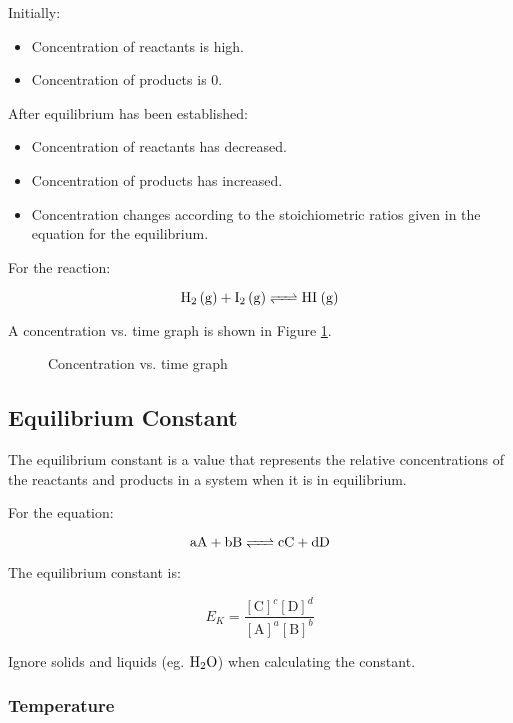 \documentclass[a4paper,11pt]{article}
\begin{document}
Initially:

\begin{itemize}
\item Concentration of reactants is high.
\item Concentration of products is 0.
\end{itemize}

After equilibrium has been established:

\begin{itemize}
\item Concentration of reactants has decreased.
\item Concentration of products has increased.
\item Concentration changes according to the stoichiometric ratios given in the
	equation for the equilibrium.
\end{itemize}

For the reaction:

$$
\ce{H2 (g) + I2 (g) <=> HI (g)}
$$

A concentration vs. time graph is shown in Figure
\ref{fig:equilibrium-concentration}.

\begin{figure}
\begin{center}
\caption{Concentration vs. time graph}
\label{fig:equilibrium-concentration}
\end{center}
\end{figure}


\subsection{Equilibrium Constant}

The equilibrium constant is a value that represents the relative concentrations
of the reactants and products in a system when it is in equilibrium.

For the equation:

$$
\ce{aA + bB <=> cC + dD}
$$

The equilibrium constant is:

$$
E_K = \frac{[\mbox{C}]^c [\mbox{D}]^d}{[\mbox{A}]^a [\mbox{B}]^b}
$$

Ignore solids and liquids (eg. $\ce{H2O}$) when calculating the constant.


\subsubsection{Temperature}
\end{document}
